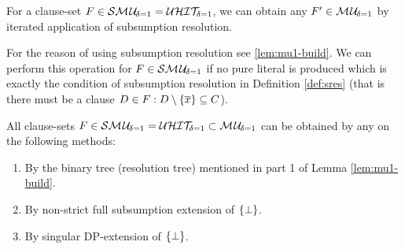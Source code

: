 \documentclass{report}
\begin{document}
\begin{lem}\label{lem:smu1tomu1}
For a clause-set $F \in \mathcal{S}\mathcal{M\hspace{0.8pt}U}_{\!\delta=1}=\mathcal{U}\mathcal{HIT}_{\!\!\delta=1} $, we can obtain any $F' \in  \mathcal{M\hspace{0.8pt}U}_{\!\delta=1}$ by iterated application of subsumption resolution.
\end{lem}
\begin{prf}
For the reason of using subsumption resolution see \ref{lem:mu1-build}. We can perform this operation for $F \in \mathcal{S}\mathcal{M\hspace{0.8pt}U}_{\!\delta=1}$ if no pure literal is produced which is exactly the condition of subsumption resolution in Definition \ref{def:sres} (that is there must be a clause $D \in F: D \setminus \{ \overline x \} \subseteq C$).
\end{prf}
\begin{lem}\label{lem:smu1-uhit1}
All clause-sets $F \in  \mathcal{S}\mathcal{M\hspace{0.8pt}U}_{\!\delta=1} = \mathcal{U}\mathcal{HIT}_{\!\!\delta=1} \subset \mathcal{M\hspace{0.8pt}U}_{\!\delta=1}$ can be obtained by any on the following methods:
  \begin{enumerate}
  \item By the binary tree (resolution tree) mentioned in part 1 of Lemma \ref{lem:mu1-build}.
  \item By non-strict full subsumption extension of $\{ \bot \}$.
  \item By singular DP-extension of $\{ \bot \}$.
  \end{enumerate} 
\end{lem}
\end{document}
